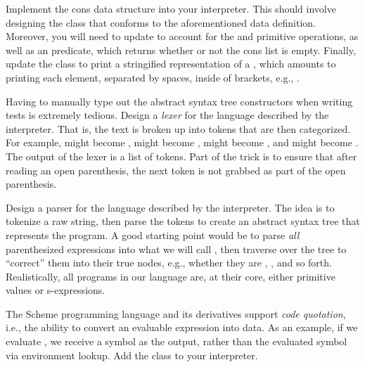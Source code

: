 Implement the cons data structure into your interpreter. This should involve designing the  class that conforms to the aforementioned data definition. Moreover, you will need to update  to account for the  and  primitive operations, as well as an  predicate, which returns whether or not the cons list is empty. Finally, update the  class to print a stringified representation of a , which amounts to printing each element, separated by spaces, inside of brackets, e.g., \ttt{[$l_0, l_1, ..., l_{n-1}]$}.

Having to manually type out the abstract syntax tree constructors when writing tests is extremely tedious. Design a \textit{lexer} for the language described by the interpreter. That is, the text is broken up into tokens that are then categorized. For example,  might become ,  might become ,  might become , and  might become . The output of the lexer is a list of tokens. Part of the trick is to ensure that after reading an open parenthesis, the next token is not grabbed as part of the open parenthesis.

Design a parser for the language described by the interpreter. The idea is to tokenize a raw string, then parse the tokens to create an abstract syntax tree that represents the program. A good starting point would be to parse \textit{all} parenthesized expressions into what we will call , then traverse over the tree to ``correct'' them into their true nodes, e.g., whether they are , , and so forth. Realistically, all programs in our language are, at their core, either primitive values or s-expressions.

The Scheme programming language and its derivatives support \textit{code quotation}, i.e., the ability to convert an evaluable expression into data. As an example, if we evaluate , we receive a symbol as the output, rather than the evaluated symbol via environment lookup. Add the  class to your interpreter.


